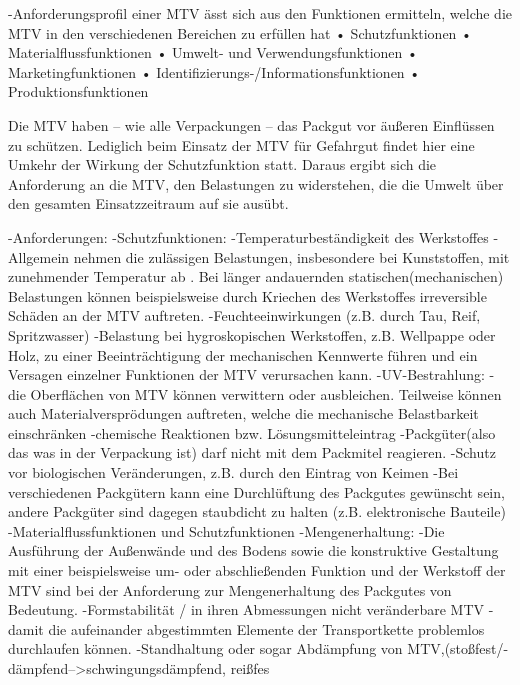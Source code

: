     -Anforderungsprofil einer MTV ässt sich aus den Funktionen ermitteln, welche die MTV in den verschiedenen Bereichen zu erfüllen hat
        • Schutzfunktionen
        • Materialflussfunktionen
        • Umwelt- und Verwendungsfunktionen
        • Marketingfunktionen
        • Identifizierungs-/Informationsfunktionen
        • Produktionsfunktionen
    
     Die MTV haben – wie alle Verpackungen – das Packgut vor äußeren Einflüssen zu schützen. Lediglich beim Einsatz der MTV für Gefahrgut findet hier eine Umkehr der Wirkung der Schutzfunktion statt. Daraus ergibt sich die Anforderung an die MTV, den Belastungen zu widerstehen, die die Umwelt über den gesamten Einsatzzeitraum auf sie ausübt.
     
-Anforderungen:
    -Schutzfunktionen:
        -Temperaturbeständigkeit des Werkstoffes
            -Allgemein nehmen die zulässigen Belastungen, insbesondere bei Kunststoffen, mit zunehmender Temperatur ab . Bei länger andauernden statischen(mechanischen) Belastungen können beispielsweise durch Kriechen des Werkstoffes irreversible Schäden an der MTV auftreten.
        -Feuchteeinwirkungen (z.B. durch Tau, Reif, Spritzwasser)
            -Belastung bei hygroskopischen Werkstoffen, z.B. Wellpappe oder Holz, zu einer Beeinträchtigung der mechanischen Kennwerte führen und ein Versagen einzelner Funktionen der MTV verursachen kann.
        -UV-Bestrahlung:
            -die Oberflächen von MTV können verwittern oder ausbleichen. Teilweise können auch Materialversprödungen auftreten, welche die mechanische Belastbarkeit einschränken
        -chemische Reaktionen bzw. Lösungsmitteleintrag
            -Packgüter(also das was in der Verpackung ist) darf nicht mit dem Packmitel reagieren.
        -Schutz vor biologischen Veränderungen, z.B. durch den Eintrag von Keimen
        -Bei verschiedenen Packgütern kann eine Durchlüftung des Packgutes gewünscht sein, andere Packgüter sind dagegen staubdicht zu halten (z.B. elektronische Bauteile)
    -Materialflussfunktionen und Schutzfunktionen    
        -Mengenerhaltung:
            -Die Ausführung der Außenwände und des Bodens sowie die konstruktive Gestaltung mit einer beispielsweise um- oder abschließenden Funktion und der Werkstoff der MTV sind bei der Anforderung zur Mengenerhaltung des Packgutes von Bedeutung.
        -Formstabilität / in ihren Abmessungen nicht veränderbare MTV
            -damit die aufeinander abgestimmten Elemente der Transportkette problemlos durchlaufen können.
        -Standhaltung oder sogar Abdämpfung von MTV,(stoßfest/-dämpfend-->schwingungsdämpfend, reißfes
